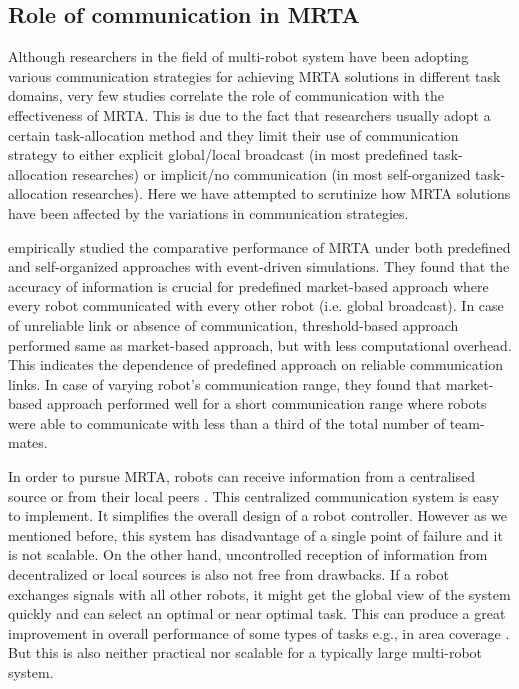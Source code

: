 \documentclass{intech}
\begin{document}
\subsection{Role of communication in MRTA}
Although researchers in the field of multi-robot system have been adopting various communication strategies for achieving MRTA solutions in different task domains, very few studies correlate the role of communication with the effectiveness of MRTA. This is due to the fact that researchers usually adopt a certain task-allocation method and they limit their use of communication strategy to either explicit global/local broadcast (in most predefined task-allocation researches) or  implicit/no communication (in most self-organized task-allocation researches). Here we have attempted to scrutinize how MRTA solutions have been affected by the variations in communication strategies.

\cite{kalra+2007} empirically studied the comparative performance of MRTA under both predefined and self-organized approaches with event-driven simulations. They found that the accuracy of information is crucial for predefined market-based approach where every robot communicated with every other robot (i.e. global broadcast). In case of unreliable link or absence of communication, threshold-based approach performed same as market-based approach, but with less computational overhead. This indicates the dependence of predefined approach on reliable communication links. In case of varying robot's communication range,  they found that market-based approach performed well for a short communication range where robots were able to communicate with less than a third of the total number of team-mates. 
  
In order to pursue MRTA, robots can receive information from a centralised source \cite{Krieger+2000} or from their local peers \citep{Agassounon+2002}. This centralized communication system is easy to implement. It simplifies the overall design of a robot controller. However as we mentioned before, this system has disadvantage of a single point of failure and it is not scalable. On the other hand, uncontrolled reception of information from decentralized or local sources is also not free from drawbacks. If a robot exchanges signals with all other robots, it might get the global view of the system quickly and can select an optimal or near optimal task. This can produce a great improvement in overall performance of some types of tasks e.g., in area coverage \cite{Rutishauser+2009}. But this is also neither practical nor scalable for a typically large multi-robot system.
\end{document}

